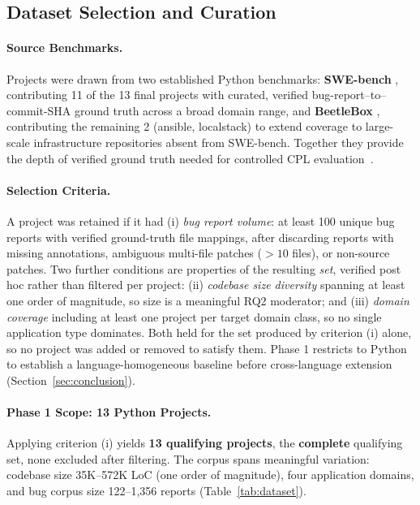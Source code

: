 \documentclass[a4paper,fleqn]{cas-dc}
\begin{document}
\subsection{Dataset Selection and Curation}
\label{sec:dataset}

\paragraph{Source Benchmarks.}
Projects were drawn from two established Python benchmarks: \textbf{SWE-bench}
\citep{jimenez2023swe}, contributing 11 of the 13 final projects with curated,
verified bug-report--to--commit-SHA ground truth across a broad domain
range, and \textbf{BeetleBox} \citep{chakraborty2025blaze}, contributing the
remaining 2 (ansible, localstack) to extend coverage to large-scale
infrastructure repositories absent from SWE-bench. Together they provide
the depth of verified ground truth needed for controlled CPL
evaluation~\citep{kalliamvakou2014promises}.

\paragraph{Selection Criteria.}
A project was retained if it had (i) \emph{bug report volume}: at least 100
unique bug reports with verified ground-truth file mappings, after
discarding reports with missing annotations, ambiguous multi-file patches
($>10$ files), or non-source patches. Two further conditions are properties
of the resulting \emph{set}, verified post hoc rather than filtered per
project: (ii) \emph{codebase size diversity} spanning at least one order of
magnitude, so size is a meaningful RQ2 moderator; and (iii) \emph{domain
coverage} including at least one project per target domain class, so no
single application type dominates. Both held for the set produced by
criterion (i) alone, so no project was added or removed to satisfy them.
Phase 1 restricts to Python to establish a language-homogeneous baseline
before cross-language extension (Section~\ref{sec:conclusion}).

\paragraph{Phase 1 Scope: 13 Python Projects.}
 Applying criterion (i) yields \textbf{13 qualifying projects},
the \textbf{complete} qualifying set, none excluded after filtering. The
corpus spans meaningful variation: codebase size 35K--572K LoC (one order
of magnitude), four application domains, and bug corpus size 122--1,356
reports (Table~\ref{tab:dataset}).
\end{document}
